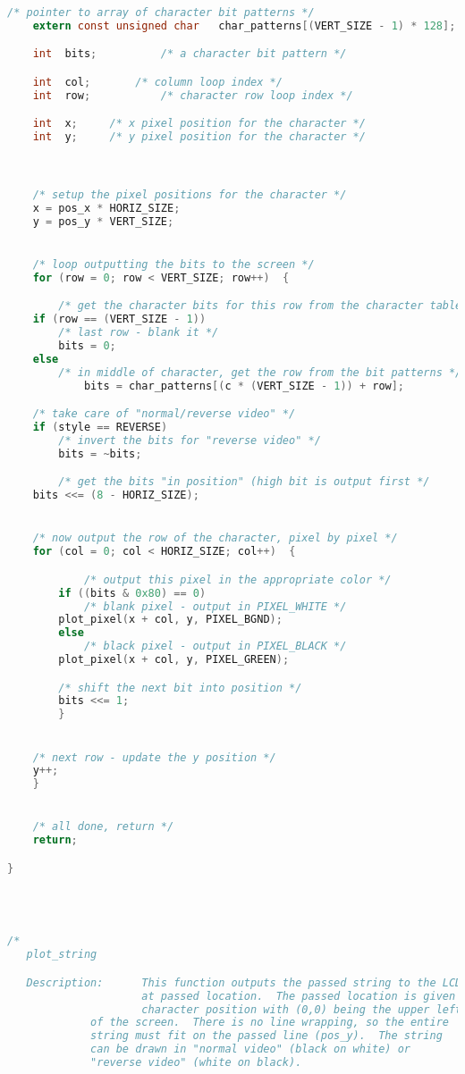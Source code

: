 \begin{lstlisting}[language=C]
    /* pointer to array of character bit patterns */
    extern const unsigned char   char_patterns[(VERT_SIZE - 1) * 128];

    int  bits;          /* a character bit pattern */

    int  col;		/* column loop index */
    int  row;           /* character row loop index */

    int  x;		/* x pixel position for the character */
    int  y;		/* y pixel position for the character */



    /* setup the pixel positions for the character */
    x = pos_x * HORIZ_SIZE;
    y = pos_y * VERT_SIZE;


    /* loop outputting the bits to the screen */
    for (row = 0; row < VERT_SIZE; row++)  {

        /* get the character bits for this row from the character table */
	if (row == (VERT_SIZE - 1))
	    /* last row - blank it */
	    bits = 0;
	else
	    /* in middle of character, get the row from the bit patterns */
            bits = char_patterns[(c * (VERT_SIZE - 1)) + row];

	/* take care of "normal/reverse video" */
	if (style == REVERSE)
	    /* invert the bits for "reverse video" */
	    bits = ~bits;

        /* get the bits "in position" (high bit is output first */
	bits <<= (8 - HORIZ_SIZE);


	/* now output the row of the character, pixel by pixel */
	for (col = 0; col < HORIZ_SIZE; col++)  {

            /* output this pixel in the appropriate color */
	    if ((bits & 0x80) == 0)
	        /* blank pixel - output in PIXEL_WHITE */
		plot_pixel(x + col, y, PIXEL_BGND);
	    else
	        /* black pixel - output in PIXEL_BLACK */
		plot_pixel(x + col, y, PIXEL_GREEN);

	    /* shift the next bit into position */
	    bits <<= 1;
        }


	/* next row - update the y position */
	y++;
    }


    /* all done, return */
    return;

}




/*
   plot_string

   Description:      This function outputs the passed string to the LCD screen
                     at passed location.  The passed location is given as a
                     character position with (0,0) being the upper left corner
		     of the screen.  There is no line wrapping, so the entire
		     string must fit on the passed line (pos_y).  The string
		     can be drawn in "normal video" (black on white) or
		     "reverse video" (white on black).


\end{lstlisting}
